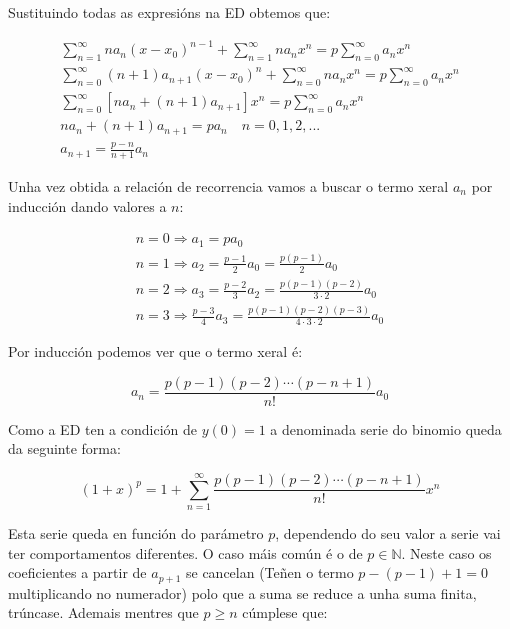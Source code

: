 \documentclass[a4paper,12pt,titlepage]{article}
\begin{document}
Sustituindo todas as expresións na ED obtemos que:

\begin{equation*}
    \begin{gathered}
        \sum_{n=1}^{\infty} na_n(x-x_0)^{n-1} + \sum_{n=1}^{\infty} na_nx^n = p\sum_{n=0}^{\infty}a_nx^n\\
        \sum_{n=0}^{\infty} (n+1)a_{n+1}(x-x_0)^{n} + \sum_{n=0}^{\infty} na_nx^n = p\sum_{n=0}^{\infty}a_nx^n\\
        \sum_{n=0}^{\infty} [na_n+(n+1)a_{n+1}]x^n= p\sum_{n=0}^{\infty}a_nx^n \\
        na_n+(n+1)a_{n+1} = pa_n \quad n=0,1,2,... \\
        a_{n+1} = \frac{p-n}{n+1}a_n
    \end{gathered}
\end{equation*}

\newpage

Unha vez obtida a relación de recorrencia vamos a buscar o termo xeral $a_n$ por inducción dando valores a $n$:

\begin{equation*}
    \begin{array}{l}
        n=0  \Rightarrow a_1 = pa_0 \\
        n=1 \Rightarrow a_2 = \frac{p-1}{2} a_0 = \frac{p(p-1)}{2}a_0 \\
        n=2 \Rightarrow a_3 = \frac{p-2}{3}a_2 = \frac{p(p-1)(p-2)}{3\cdot2}a_0 \\
        n = 3 \Rightarrow \frac{p-3}{4}a_3 = \frac{p(p-1)(p-2)(p-3)}{4\cdot 3\cdot2}a_0
    \end{array}
\end{equation*}

Por inducción podemos ver que o termo xeral é:

\begin{equation*}
    a_n = \frac{p(p-1)(p-2)\cdots (p-n+1)}{n!}a_0
\end{equation*}

Como a ED ten a condición de $y(0)=1$ a denominada serie do binomio queda da seguinte forma:

\begin{equation*}
    (1+x)^p= 1 + \sum_{n=1}^{\infty} \frac{p(p-1)(p-2)\cdots (p-n+1)}{n!} x^n
\end{equation*}

Esta serie queda en función do parámetro $p$, dependendo do seu valor a serie vai ter comportamentos diferentes. O caso máis común é o de $p\in \mathbb{N}$. Neste caso os coeficientes a partir de $a_{p+1}$ se cancelan (Teñen o termo $p-(p-1)+1=0$ multiplicando no numerador) polo que a suma se reduce a unha suma finita, trúncase. Ademais mentres que $p\geq n$ cúmplese que:
\end{document}
